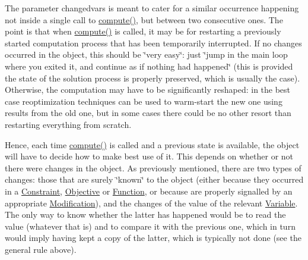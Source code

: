 The parameter changedvars is meant to cater for a similar occurrence happening not inside a single call to \mbox{\hyperlink{class_s_m_spp__di__unipi__it_1_1_thin_compute_interface_a00fd6363d98ea46bcc273842b327d050}{compute()}}, but between two consecutive ones. The point is that when \mbox{\hyperlink{class_s_m_spp__di__unipi__it_1_1_thin_compute_interface_a00fd6363d98ea46bcc273842b327d050}{compute()}} is called, it may be for restarting a previously started computation process that has been temporarily interrupted. If no changes occurred in the object, this should be \char`\"{}very easy\char`\"{}\+: just \char`\"{}jump in the main loop where you exited it,
and continue as if nothing had happened\char`\"{} (this is provided the state of the solution process is properly preserved, which is usually the case). Otherwise, the computation may have to be significantly reshaped\+: in the best case reoptimization techniques can be used to warm-\/start the new one using results from the old one, but in some cases there could be no other resort than restarting everything from scratch.

Hence, each time \mbox{\hyperlink{class_s_m_spp__di__unipi__it_1_1_thin_compute_interface_a00fd6363d98ea46bcc273842b327d050}{compute()}} is called and a previous state is available, the object will have to decide how to make best use of it. This depends on whether or not there were changes in the object. As previously mentioned, there are two types of changes\+: those that are surely \char`\"{}known\char`\"{} to the object (either because they occurred in a \mbox{\hyperlink{class_s_m_spp__di__unipi__it_1_1_constraint}{Constraint}}, \mbox{\hyperlink{class_s_m_spp__di__unipi__it_1_1_objective}{Objective}} or \mbox{\hyperlink{class_s_m_spp__di__unipi__it_1_1_function}{Function}}, or because are properly signalled by an appropriate \mbox{\hyperlink{class_s_m_spp__di__unipi__it_1_1_modification}{Modification}}), and the changes of the value of the relevant \mbox{\hyperlink{class_s_m_spp__di__unipi__it_1_1_variable}{Variable}}. The only way to know whether the latter has happened would be to read the value (whatever that is) and to compare it with the previous one, which in turn would imply having kept a copy of the latter, which is typically not done (see the general rule above).

